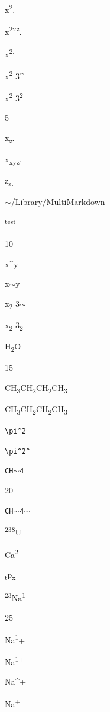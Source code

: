 
\def\mytitle{Superscript}


x\textsuperscript{2}.

x\textsuperscript{2xz}.

x\textsuperscript{2.}

x\textsuperscript{2} 3\^{}

x\textsuperscript{2} 3\textsuperscript{2}

5

x\textsubscript{z}.

x\textsubscript{xyz}.

z\textsubscript{z.}

\ensuremath{\sim}/Library/MultiMarkdown

\textsuperscript{test}

10

x\^{}y

x\ensuremath{\sim}y

x\textsubscript{2} 3\ensuremath{\sim}

x\textsubscript{2} 3\textsubscript{2}

H\textsubscript{2}O

15

CH\textsubscript{3}CH\textsubscript{2}CH\textsubscript{2}CH\textsubscript{3}

CH\textsubscript{3}CH\textsubscript{2}CH\textsubscript{2}CH\textsubscript{3}

\texttt{\textbackslash{}pi\^{}2}

\texttt{\textbackslash{}pi\^{}2\^{}}

\texttt{CH\ensuremath{\sim}4}

20

\texttt{CH\ensuremath{\sim}4\ensuremath{\sim}}

\textsuperscript{238}U

Ca\textsuperscript{2+}

\textsubscript{t}p\textsubscript{x}

\textsuperscript{23}Na\textsuperscript{1+}

25

Na\textsuperscript{1}+

Na\textsuperscript{1+}

Na\^{}+

Na\textsuperscript{+}


